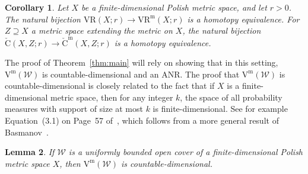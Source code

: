 \documentclass[11pt, reqno, english]{amsart}
\theoremstyle{plain}
\newtheorem{lemma}{Lemma}[section]
\newtheorem{corollary}[lemma]{Corollary}
\theoremstyle{definition}
\theoremstyle{myremark}
\newcommand{\cW}{\mathcal{W}}
\newcommand{\note}[1]{\textcolor{blue}{({#1})}}
\newcommand{\vr}[2]{\mathrm{VR}(#1;#2)}
\newcommand{\vietm}[1]{\mathrm{V}^\mathrm{m}(#1)}
\newcommand{\vrm}[2]{\mathrm{VR}^\mathrm{m}(#1;#2)}
\newcommand{\acech}[3]{\mathrm{\check{C}}(#1,#2;#3)}
\newcommand{\acechm}[3]{\mathrm{\check{C}}^\mathrm{m}(#1,#2;#3)}
\begin{document}
\begin{corollary}
\label{cor:main}
Let $X$ be a finite-dimensional Polish metric space, and let $r>0$.
The natural bijection $\vr{X}{r}\to\vrm{X}{r}$ is a homotopy equivalence.
For $Z\supseteq X$ a metric space extending the metric on $X$, the natural bijection $\acech{X}{Z}{r}\to\acechm{X}{Z}{r}$ is a homotopy equivalence.
\end{corollary}

The proof of Theorem~\ref{thm:main} will rely on showing that in this setting, $\vietm{\cW}$ is countable-dimensional and an ANR.
The proof that $\vietm{\cW}$ is countable-dimensional is closely related to the fact that if $X$ is a finite-dimensional metric space, then for any integer $k$, the space of all probability measures with support of size at most $k$ is finite-dimensional.
See for example Equation~(3.1) on Page~57 of~\cite{fedorchuk1991probability}, 
which follows from a more general result of Basmanov~\cite{basmanov1983covariant}.

\begin{lemma}
\label{lem:countable-dimensional}
If $\cW$ is a uniformly bounded open cover of a finite-dimensional Polish metric space $X$, then $\vietm{\cW}$ is countable-dimensional.
\end{lemma}

\end{document}
